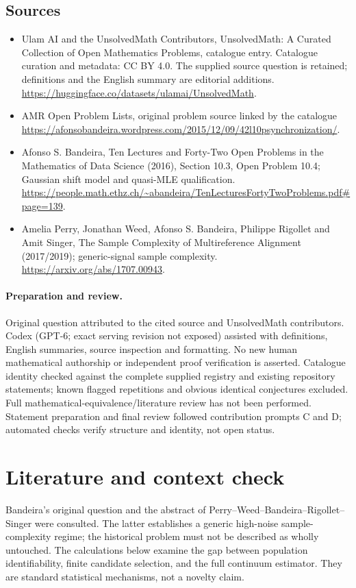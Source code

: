 \documentclass[11pt]{article}
\begin{document}
\subsection{Sources}
\begin{itemize}
\item[S1] Ulam AI and the UnsolvedMath Contributors, UnsolvedMath: A Curated Collection of Open Mathematics Problems, catalogue entry. Catalogue curation and metadata: CC BY 4.0. The supplied source question is retained; definitions and the English summary are editorial additions.
\url{https://huggingface.co/datasets/ulamai/UnsolvedMath}.
\item[S2] AMR Open Problem Lists, original problem source linked by the catalogue
\url{https://afonsobandeira.wordpress.com/2015/12/09/42l10psynchronization/}.
\item[S3] Afonso S. Bandeira, Ten Lectures and Forty-Two Open Problems in the Mathematics of Data Science (2016), Section 10.3, Open Problem 10.4; Gaussian shift model and quasi-MLE qualification.
\url{https://people.math.ethz.ch/~abandeira/TenLecturesFortyTwoProblems.pdf#page=139}.
\item[S4] Amelia Perry, Jonathan Weed, Afonso S. Bandeira, Philippe Rigollet and Amit Singer, The Sample Complexity of Multireference Alignment (2017/2019); generic-signal sample complexity.
\url{https://arxiv.org/abs/1707.00943}.
\end{itemize}
\paragraph{Preparation and review.}
Original question attributed to the cited source and UnsolvedMath contributors. Codex (GPT-6; exact serving revision not exposed) assisted with definitions, English summaries, source inspection and formatting. No new human mathematical authorship or independent proof verification is asserted. Catalogue identity checked against the complete supplied registry and existing repository statements; known flagged repetitions and obvious identical conjectures excluded. Full mathematical-equivalence/literature review has not been performed. Statement preparation and final review followed contribution prompts C and D; automated checks verify structure and identity, not open status.
\label{end:statement}

\section{Literature and context check}
Bandeira's original question and the abstract of Perry--Weed--Bandeira--Rigollet--Singer
were consulted. The latter establishes a generic high-noise sample-complexity
regime; the historical problem must not be described as wholly untouched.
The calculations below examine the gap between population identifiability,
finite candidate selection, and the full continuum estimator. They are standard
statistical mechanisms, not a novelty claim.
\end{document}
